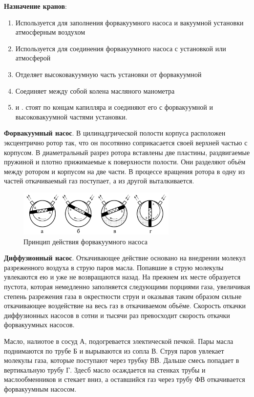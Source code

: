\documentclass{article}
\newcommand{\bb}{\textbf}
\begin{document}
\bb{Назначение кранов}:
\begin{enumerate}
    \item Используется для заполнения форвакуумного насоса и вакуумной установки атмосферным воздухом
    \item Используется для соединения форвакуумного насоса с установкой или атмосферой
    \item Отделяет высоковакуумную часть установки от форвакуумной
    \item Соединяет между собой колена масляного манометра
    \item и . стоят по концам капилляра и соединяют его с форвакуумной и высоковакуумной частями установки.
\end{enumerate}

\bb{Форвакуумный насос}. В цилинадгрической полости корпуса расположен эксцентрично ротор так, что он посотянно соприкасается своей верхней частью с корпусом. В диаметральный разрез ротора вставлены две пластины, раздвигаемые пружиной и плотно прижимаемые к поверхности полости. Они разделяют объём между ротором и корпусом на две части. В процессе вращения ротора в одну из частей откачиваемый газ поступает, а из другой выталкивается.

\begin{figure}[h!]
    \centering
    \includegraphics[width=0.7\textwidth]{Screenshot from 2023-02-21 13-13-09.png}
    \caption{Принцип действия форвакуумного насоса}
    \label{pic2}
\end{figure}

\bb{Диффузионный насос}. Откачивающее действие основано на внедрении молекул разреженного воздуха в струю паров масла. Попавшие в струю молекулы увлекаются ею и уже не возвращаются назад. На прежнем их месте образуется пустота, которая немедленно заполняется следующими порциями газа, увеличивая степень разрежения газа в окрестности струи и оказывая таким образом сильне откачивающее воздействие на весь газ в откачиваемом объёме. Скорость откачки диффузионных насосов в сотни и тысячи раз превосходит скорость откачки форвакуумных насосов.

Масло, налиотое в сосуд А, подогревается электической печкой. Пары масла поднимаются по трубе Б и вырываются из сопла В. Струя паров увлекает молекулы газа, которые поступают через трубку ВВ. Дальше смесь попадает в вертикальную трубу Г. Здесб масло осаждается на стенках трубы и маслообменников и стекает вниз, а оставшийся газ через трубу ФВ откачивается форвакуумным насосом.
\newpage
\end{document}
